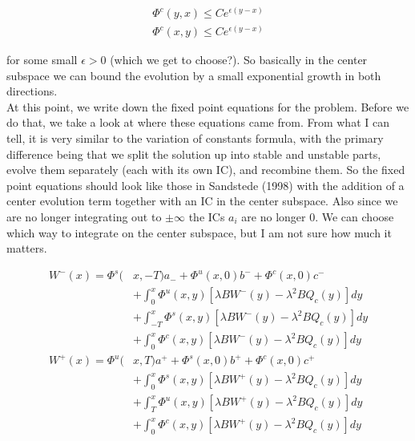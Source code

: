 \documentclass[12pt]{article}
\begin{document}
\begin{align*}
\Phi^c(y, x) \leq C e^{\epsilon(y-x)} \\
\Phi^c(x, y) \leq C e^{\epsilon(y-x)}
\end{align*}

for some small $\epsilon > 0$ (which we get to choose?). So basically in the center subspace we can bound the evolution by a small exponential growth in both directions.\\

At this point, we write down the fixed point equations for the problem. Before we do that, we take a look at where these equations came from. From what I can tell, it is very similar to the variation of constants formula, with the primary difference being that we split the solution up into stable and unstable parts, evolve them separately (each with its own IC), and recombine them. So the fixed point equations should look like those in Sandstede (1998) with the addition of a center evolution term together with an IC in the center subspace. Also since we are no longer integrating out to $\pm \infty$ the ICs $a_i$ are no longer 0. We can choose which way to integrate on the center subspace, but I am not sure how much it matters. 

\begin{align*}
W^-(x) = \Phi^s(&x, -T)a_- + \Phi^u(x, 0)b^- + \Phi^c(x, 0)c^- \\
&+ \int_0^x \Phi^u(x, y)[\lambda B W^-(y) - \lambda^2 B Q_c(y) ] dy \\
&+ \int_{-T}^x \Phi^s(x, y)[\lambda B W^-(y) - \lambda^2 B Q_c(y) ] dy \\
&+ \int_0^x \Phi^c(x, y)[\lambda B W^-(y) - \lambda^2 B Q_c(y) ] dy \\
W^+(x) = \Phi^u(&x, T)a^+ + \Phi^s(x, 0)b^+ + \Phi^c(x, 0)c^+ \\
&+ \int_0^x \Phi^s(x, y)[\lambda B W^+(y) - \lambda^2 B Q_c(y) ] dy \\
&+ \int_T^x \Phi^u(x, y)[\lambda B W^+(y) - \lambda^2 B Q_c(y) ]dy \\
&+ \int_0^x \Phi^c(x, y)[\lambda B W^+(y) - \lambda^2 B Q_c(y) ] dy
\end{align*}
\end{document}
